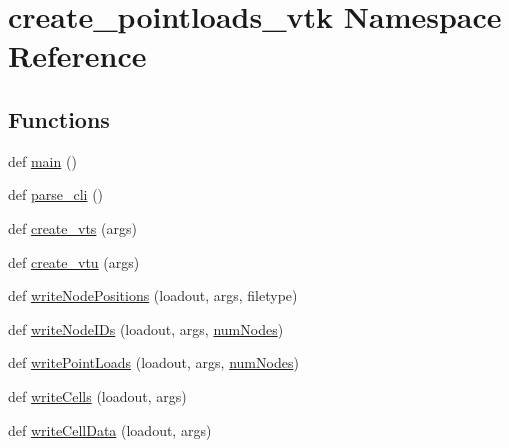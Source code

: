 \hypertarget{namespacecreate__pointloads__vtk}{}\section{create\+\_\+pointloads\+\_\+vtk Namespace Reference}
\label{namespacecreate__pointloads__vtk}
\subsection*{Functions}
\begin{DoxyCompactItemize}
\item 
def \hyperlink{namespacecreate__pointloads__vtk_a6ea6d2d37a8d4c688dff97106f96be0d}{main} ()
\item 
def \hyperlink{namespacecreate__pointloads__vtk_a65c768a8aa5e6fae03ee5aea5ecaf6a9}{parse\+\_\+cli} ()
\item 
def \hyperlink{namespacecreate__pointloads__vtk_a6ecb29d9159ba8d738c2073c7268ac4e}{create\+\_\+vts} (args)
\item 
def \hyperlink{namespacecreate__pointloads__vtk_abfe588cef6baa9584990ffb931800fa6}{create\+\_\+vtu} (args)
\item 
def \hyperlink{namespacecreate__pointloads__vtk_a7548d10cb2c8c38cad75c94272d24e93}{write\+Node\+Positions} (loadout, args, filetype)
\item 
def \hyperlink{namespacecreate__pointloads__vtk_a7cf2f65a492550fa8526f4e41f22fb2b}{write\+Node\+I\+Ds} (loadout, args, \hyperlink{dynaField_8m_af9bd6d4d8ecd1b0563241fd648435e14}{num\+Nodes})
\item 
def \hyperlink{namespacecreate__pointloads__vtk_af98328e3ca7388c3cf7304f2823060ca}{write\+Point\+Loads} (loadout, args, \hyperlink{dynaField_8m_af9bd6d4d8ecd1b0563241fd648435e14}{num\+Nodes})
\item 
def \hyperlink{namespacecreate__pointloads__vtk_ae111dff13abca12198d5862fa7933be9}{write\+Cells} (loadout, args)
\item 
def \hyperlink{namespacecreate__pointloads__vtk_aef22e82908872fba7bb6dc2b4f7c8bdb}{write\+Cell\+Data} (loadout, args)
\end{DoxyCompactItemize}


